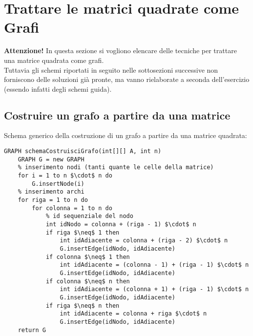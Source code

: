 \documentclass[../cheatSheetAlgoritmi.tex]{subfiles}
\begin{document}
\section{Trattare le matrici quadrate come Grafi}
\textbf{Attenzione!} In questa sezione si vogliono elencare delle tecniche per trattare una matrice quadrata come grafi. \\Tuttavia gli schemi riportati in seguito nelle sottosezioni successive non forniscono delle soluzioni già pronte, ma vanno rielaborate a seconda dell'esercizio (essendo infatti degli schemi guida).
\subsection{Costruire un grafo a partire da una matrice}
Schema generico della costruzione di un grafo a partire da una matrice quadrata:
\begin{lstlisting}[caption=Schema costruzione Grafo da una matrice]
GRAPH schemaCostruisciGrafo(int[][] A, int n)
	GRAPH G = new GRAPH
  	% inserimento nodi (tanti quante le celle della matrice)
  	for i = 1 to n $\cdot$ n do
  		G.insertNode(i)
  	% inserimento archi
  	for riga = 1 to n do
    	for colonna = 1 to n do
      		% id sequenziale del nodo
      		int idNodo = colonna + (riga - 1) $\cdot$ n
      		if riga $\neq$ 1 then 
        		int idAdiacente = colonna + (riga - 2) $\cdot$ n
        		G.insertEdge(idNodo, idAdiacente)
      		if colonna $\neq$ 1 then
        		int idAdiacente = (colonna - 1) + (riga - 1) $\cdot$ n
        		G.insertEdge(idNodo, idAdiacente)
      		if colonna $\neq$ n then
        		int idAdiacente = (colonna + 1) + (riga - 1) $\cdot$ n
        		G.insertEdge(idNodo, idAdiacente)
      		if riga $\neq$ n then
        		int idAdiacente = colonna + riga $\cdot$ n
        		G.insertEdge(idNodo, idAdiacente)
  	return G
\end{lstlisting}
\end{document}
